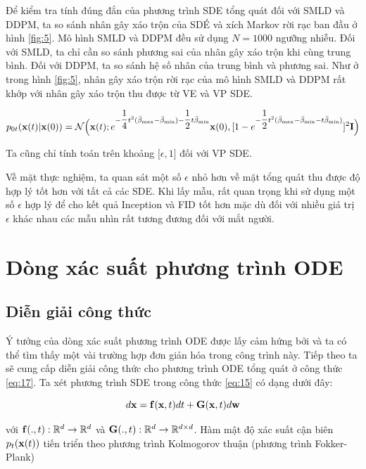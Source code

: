 \documentclass{article} %
\begin{document}
Để kiểm tra tính đúng đắn của phương trình SDE tổng quát đối với SMLD và DDPM, ta so sánh nhân gây xáo trộn của SDÉ và xích Markov rời rạc ban đầu ở hình \ref{fig:5}.
Mô hình SMLD và DDPM đều sử dụng $N=1000$ ngưỡng nhiễu.
Đối với SMLD, ta chỉ cần so sánh phương sai của nhân gây xáo trộn khi cùng trung bình.
Đối với DDPM, ta so sánh hệ số nhân của trung bình và phương sai.
Như ở trong hình \ref{fig:5}, nhân gây xáo trộn rời rạc của mô hình SMLD và DDPM rất khớp với nhân gây xáo trộn thu được từ VE và VP SDE.

\begin{equation}
    p_{0t}(\bold{x}(t) \vert \bold{x}(0)) = \mathcal{N} \Big( \bold{x}(t); e^{-\dfrac{1}{4}t^2 (\bar{\beta}_{\max} - \bar{\beta}_{\min}) - \dfrac{1}{2}t\bar{\beta}_{\min}} \bold{x}(0), \lbrack 1 - e^{-\dfrac{1}{2}t^2 (\bar{\beta}_{\max} - \bar{\beta}_{\min} - t\bar{\beta}_{\min})} \rbrack^2 \bold{I} \Big)
\end{equation}

Ta cũng chỉ tính toán trên khoảng $\lbrack \epsilon, 1 \rbrack$ đối với VP SDE.

Về mặt thực nghiệm, ta quan sát một số $\epsilon$ nhỏ hơn về mặt tổng quát thu được độ hợp lý tốt hơn với tất cả các SDE.
Khi lấy mẫu, rất quan trọng khi sử dụng một số $\epsilon$ hợp lý để cho kết quả Inception và FID tốt hơn mặc dù đối với nhiều giá trị $\epsilon$ khác nhau các mẫu nhìn rất tương đương đối với mắt người. 


\section{Dòng xác suất phương trình ODE}

\subsection{Diễn giải công thức}

Ý tưởng của dòng xác suất phương trình ODE được lấy cảm hứng bởi \citep{maoutsa2020interacting} và ta có thể tìm thấy một vài trường hợp đơn giản hóa trong công trình này.
Tiếp theo ta sẽ cung cấp diễn giải công thức cho phương trình ODE tổng quát ở công thức \ref{eq:17}.
Ta xét phương trình SDE trong công thức \ref{eq:15} có dạng dưới đây:

\begin{equation*}
    d \bold{x} = \bold{f} (\bold{x}, t) dt + \bold{G}(\bold{x}, t) d \bold{w}
\end{equation*}

với $\bold{f}(., t): \mathbb{R}^d \rightarrow \mathbb{R}^d$ và $\bold{G}(., t): \mathbb{R}^d \rightarrow \mathbb{R}^{d\times d}$.
Hàm mật độ xác suất cận biên $p_t(\bold{x}(t))$ tiến triển theo phương trình Kolmogorov thuận (phương trình Fokker-Plank) \citep{oksendal2003stochastic}
\end{document}
